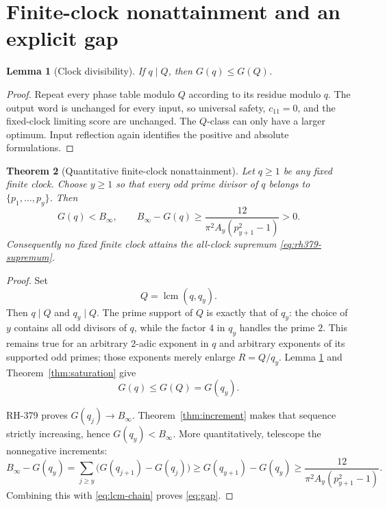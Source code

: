 \documentclass[11pt]{article}
\newtheorem{theorem}{Theorem}[section]
\newtheorem{lemma}[theorem]{Lemma}
\theoremstyle{definition}
\theoremstyle{remark}
\begin{document}
\section{Finite-clock nonattainment and an explicit gap}

\begin{lemma}[Clock divisibility]
\label{lem:divisibility}
If $q\mid Q$, then $G(q)\le G(Q)$.
\end{lemma}

\begin{proof}
Repeat every phase table modulo $Q$ according to its residue modulo $q$.
The output word is unchanged for every input, so universal safety,
$c_{11}=0$, and the fixed-clock limiting score are unchanged.  The
$Q$-class can only have a larger optimum.  Input reflection again identifies
the positive and absolute formulations.
\end{proof}

\begin{theorem}[Quantitative finite-clock nonattainment]
\label{thm:nonattainment}
Let $q\ge1$ be any fixed finite clock.  Choose $y\ge1$ so that every odd
prime divisor of $q$ belongs to $\{p_1,\ldots,p_y\}$.  Then
\begin{equation}
 \boxed{\displaystyle
 G(q)<B_\infty,\qquad
 B_\infty-G(q)\ge
 \frac{12}{\pi^2A_y(p_{y+1}^2-1)}>0.}
 \label{eq:gap}
\end{equation}
Consequently no fixed finite clock attains the all-clock supremum
\eqref{eq:rh379-supremum}.
\end{theorem}

\begin{proof}
Set
\[
                         Q=\operatorname{lcm}(q,q_y).
\]
Then $q\mid Q$ and $q_y\mid Q$.  The prime support of $Q$ is exactly that
of $q_y$: the choice of $y$ contains all odd divisors of $q$, while the
factor $4$ in $q_y$ handles the prime $2$.  This remains true for an
arbitrary $2$-adic exponent in $q$ and arbitrary exponents of its supported
odd primes; those exponents merely enlarge $R=Q/q_y$.  Lemma
\ref{lem:divisibility} and Theorem~\ref{thm:saturation} give
\begin{equation}
                         G(q)\le G(Q)=G(q_y).
 \label{eq:lcm-chain}
\end{equation}

RH-379 proves $G(q_j)\to B_\infty$.  Theorem~\ref{thm:increment} makes
that sequence strictly increasing, hence $G(q_y)<B_\infty$.  More
quantitatively, telescope the nonnegative increments:
\[
 B_\infty-G(q_y)
 =\sum_{j\ge y}\bigl(G(q_{j+1})-G(q_j)\bigr)
 \ge G(q_{y+1})-G(q_y)
 \ge\frac{12}{\pi^2A_y(p_{y+1}^2-1)}.
\]
Combining this with \eqref{eq:lcm-chain} proves \eqref{eq:gap}.
\end{proof}
\end{document}
